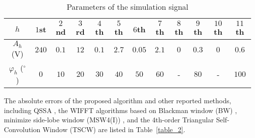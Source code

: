 \documentclass[journal,twoside]{IEEEtran}
\begin{document}
\begin{table}
	\renewcommand{\arraystretch}{1.3}
	\caption{Parameters of the simulation signal}
	\label{table_1}
	\centering
	\begin{tabular}{@{ }c@{ }@{ }c@{ }@{ }c@{ }@{ }c@{ }@{ }c@{ }@{ }c@{ }@{ }c@{ }@{ }c@{ }@{ }c@{ }@{ }c@{ }@{ }c@{ }@{ }c@{ }}
		\toprule
		$h$ & $1$st & $2$nd & $3$rd & $4$th & $5$th & $6$th & $7$th & $8$th & $9$th & $10$th & $11$th \\
		\midrule
		$A_h$ (V) & $240$ & $0.1$ & $12$ & $0.1$ & $2.7$ & $0.05$ & $2.1$ & $0$ & $0.3$ & $0$ & $0.6$ \\
		$\varphi_h$ ($^\circ$) & $0$ & $10$ & $20$ & $30$ & $40$ & $50$ & $60$ & - & $80$ & - & $100$ \\
		\bottomrule
	\end{tabular}
\end{table}

The absolute errors of the proposed algorithm and other reported methods, including QSSA \cite{Zhou2011}, the WIFFT algorithms based on Blackman window (BW) \cite{Harris1978}, minimize side-lobe window (MSW4(I)) \cite{Wen2011}, and the 4th-order Triangular Self-Convolution Window (TSCW) \cite{Wen2014} are listed in Table~\ref{table_2}.
\end{document}
